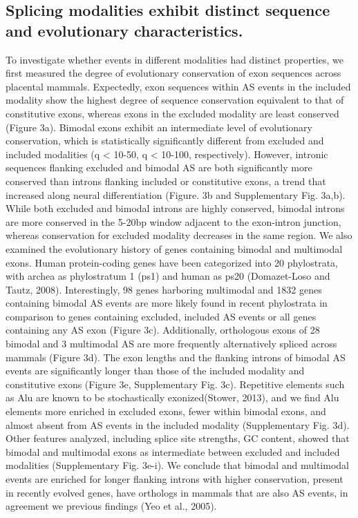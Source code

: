 \subsection{Splicing modalities exhibit distinct sequence and evolutionary characteristics.}

To investigate whether events in different modalities had distinct properties, we first measured the degree of evolutionary conservation of exon sequences across placental mammals. Expectedly, exon sequences within AS events in the included modality show the highest degree of sequence conservation equivalent to that of constitutive exons, whereas exons in the excluded modality are least conserved (Figure 3a). Bimodal exons exhibit an intermediate level of evolutionary conservation, which is statistically significantly different from excluded and included modalities (q < 10-50, q < 10-100, respectively). However, intronic sequences flanking excluded and bimodal AS are both significantly more conserved than introns flanking included or constitutive exons, a trend that increased along neural differentiation (Figure. 3b and Supplementary Fig. 3a,b). While both excluded and bimodal introns are highly conserved, bimodal introns are more conserved in the 5-20bp window adjacent to the exon-intron junction, whereas conservation for excluded modality decreases in the same region. We also examined the evolutionary history of genes containing bimodal and multimodal exons. Human protein-coding genes have been categorized into 20 phylostrata, with archea as phylostratum 1 (ps1) and human as ps20 (Domazet-Loso and Tautz, 2008). Interestingly, 98 genes harboring multimodal and 1832 genes containing bimodal AS events are more likely found in recent phylostrata in comparison to genes containing excluded, included AS events or all genes containing any AS exon (Figure 3c). Additionally, orthologous exons of 28 bimodal and 3 multimodal AS are more frequently alternatively spliced across mammals (Figure 3d). The exon lengths and the flanking introns of bimodal AS events are significantly longer than those of the included modality and constitutive exons (Figure 3e, Supplementary Fig. 3c). Repetitive elements such as Alu are known to be stochastically exonized(Stower, 2013), and we find Alu elements more enriched in excluded exons, fewer within bimodal exons, and almost absent from AS events in the included modality (Supplementary Fig. 3d). Other features analyzed, including splice site strengths, GC content, showed that bimodal and multimodal exons as intermediate between excluded and included modalities (Supplementary Fig. 3e-i). We conclude that bimodal and multimodal events are enriched for longer flanking introns with higher conservation, present in recently evolved genes, have orthologs in mammals that are also AS events, in agreement we previous findings (Yeo et al., 2005). 

